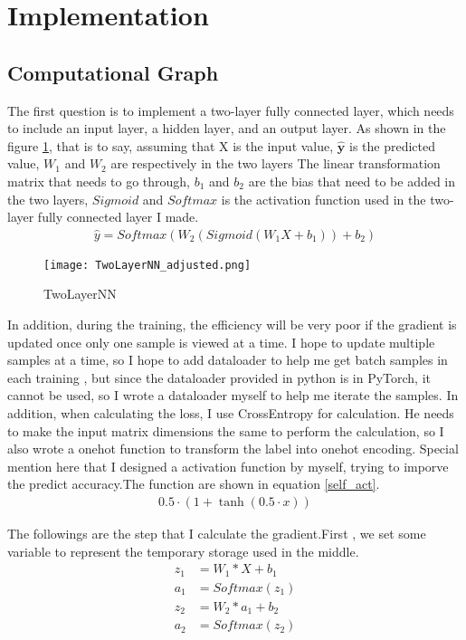 \documentclass[conference]{IEEEtran}
\begin{document}
\section{Implementation}

    \subsection{Computational Graph}
    The first question is to implement a two-layer fully connected layer, which needs to include an input layer, a hidden layer, and an output layer. As shown in the figure \ref{fig:twolayerfc}, that is to say, assuming that X is the input value, $\hat{\mathbf{y}}$ is the predicted value, $W_1$ and $W_2$ are respectively in the two layers The linear transformation matrix that needs to go through, $b_1$ and $b_2$ are the bias that need to be added in the two layers, $Sigmoid$ and $Softmax$ is the activation function used in the two-layer fully connected layer I made.
    \begin{align}
        \hat{y} = Softmax(W_2(Sigmoid(W_1 X + b_1)) + b_2)
    \end{align}

    \begin{figure}[htb]
        \centering
        \texttt{[image: TwoLayerNN\_adjusted.png]}
        \caption{TwoLayerNN}
        \label{fig:twolayerfc}
    \end{figure}
        
    \indent In addition, during the training, the efficiency will be very poor if the gradient is updated once only one sample is viewed at a time. I hope to update multiple samples at a time, so I hope to add dataloader to help me get batch samples in each training , but since the dataloader provided in python is in PyTorch, it cannot be used, so I wrote a dataloader myself to help me iterate the samples. In addition, when calculating the loss, I use CrossEntropy for calculation. He needs to make the input matrix dimensions the same to perform the calculation, so I also wrote a onehot function to transform the label into onehot encoding.
    \indent Special mention here that I designed a activation function by myself, trying to imporve the predict accuracy.The function are shown in equation \ref{self_act}.
    \begin{align}
        0.5\cdot\left(1+\tanh\left(0.5\cdot x\right)\right)
        \label{self_act}
    \end{align}
    

    \indent The followings are the step that I calculate the gradient.First , we set some variable to represent the temporary storage used in the middle.\
    \begin{equation}
        \begin{aligned}
            z_1 &= W_1 * X + b_1 \\ 
            a_1 &= Softmax(z_1) \\
            z_2 &= W_2 * a_1 + b_2 \\
            a_2 &= Softmax(z_2)
        \end{aligned}
    \end{equation}
    
\end{document}
